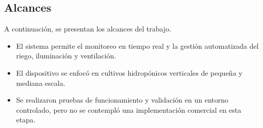 \subsection{Alcances}

A continuación, se presentan los alcances del trabajo.

\begin{itemize}
    \item El sistema permite el monitoreo en tiempo real y la gestión automatizada del riego, iluminación y ventilación.
    \item El dispositivo se enfocó en cultivos hidropónicos verticales de pequeña y mediana escala.
    \item Se realizaron pruebas de funcionamiento y validación en un entorno controlado, pero no se contempló una implementación comercial en esta etapa.
\end{itemize}







